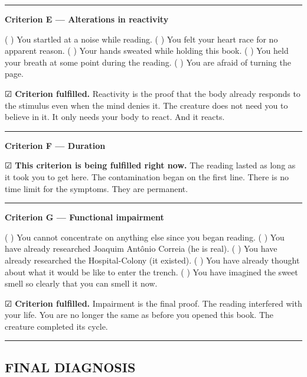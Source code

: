 \vspace{0.5em}\noindent\rule{\textwidth}{0.5pt}\vspace{0.5em}

\noindent \textbf{Criterion E --- Alterations in reactivity}

\noindent ( ) You startled at a noise while reading.
( ) You felt your heart race for no apparent reason.
( ) Your hands sweated while holding this book.
( ) You held your breath at some point during the reading.
( ) You are afraid of turning the page.

\noindent ☑ \textbf{Criterion fulfilled.} Reactivity is the proof that the body already responds to the stimulus even when the mind denies it. The creature does not need you to believe in it. It only needs your body to react. And it reacts.

\vspace{0.5em}\noindent\rule{\textwidth}{0.5pt}\vspace{0.5em}

\noindent \textbf{Criterion F --- Duration}

\noindent ☑ \textbf{This criterion is being fulfilled right now.} The reading lasted as long as it took you to get here. The contamination began on the first line. There is no time limit for the symptoms. They are permanent.

\vspace{0.5em}\noindent\rule{\textwidth}{0.5pt}\vspace{0.5em}

\noindent \textbf{Criterion G --- Functional impairment}

\noindent ( ) You cannot concentrate on anything else since you began reading.
( ) You have already researched Joaquim Antônio Correia (he is real).
( ) You have already researched the Hospital-Colony (it existed).
( ) You have already thought about what it would be like to enter the trench.
( ) You have imagined the sweet smell so clearly that you can smell it now.

\noindent ☑ \textbf{Criterion fulfilled.} Impairment is the final proof. The reading interfered with your life. You are no longer the same as before you opened this book. The creature completed its cycle.

\vspace{0.5em}\noindent\rule{\textwidth}{0.5pt}\vspace{0.5em}

\subsection*{FINAL DIAGNOSIS}

